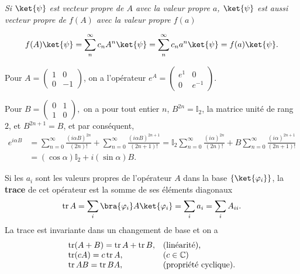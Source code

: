 \colorbox[gray]{0.8}{
\parbox[c]{0.9\textwidth}{
\emph{Si $\ket{\psi}$ est vecteur propre de $A$ avec la valeur propre $a$,
$\ket{\psi}$ est aussi vecteur propre de $f(A)$ avec la valeur propre $f(a)$}

\begin{equation}
f(A)\ket{\psi}=\sum_{n}^{\infty}c_{n}%
A^{n}\ket{\psi}=\sum_{n}^{\infty}c_{n}a^{n}\ket{\psi}=f(a)\ket{\psi}.
\end{equation}
}}

\begin{example}
Pour $A=\begin{pmatrix}1 & 0\\0 & -1\end{pmatrix} $, on a l'opérateur
$e^A=\begin{pmatrix}e^{1} & 0\\0 & e^{-1}\end{pmatrix}$.

Pour $B=\begin{pmatrix}0 & 1\\1 & 0\end{pmatrix},$ on a pour tout entier $n$,
$B^{2n}=\mathbb{I}_{2}$, la matrice unité de rang $2$, et $B^{2n+1}=B$, et par
conséquent,
\begin{equation}
\label{eq:ExpoB}
\begin{split}
e^{i\alpha B} &  =\sum_{n=0}^{\infty}\frac{(i\alpha B)^{2n}}{(2n)!}
+\sum_{n=0}^{\infty}\frac{(i\alpha B)^{2n+1}}{(2n+1)!}
=\mathbb{I}_{2}\sum_{n=0}^{\infty}\frac{(i\alpha)^{2n}}{(2n)!}+B\sum_{n=0}%
^{\infty}\frac{(i\alpha)^{2n+1}}{(2n+1)!}\\
&  =(\cos\alpha)\mathbb{I}_{2}+i(\sin\alpha)B.
\end{split}
\end{equation}

\end{example}

Si les $a_{i}$ sont les valeurs propres de l'opérateur $A$ dans la base
$\{\ket{\varphi_{i}}\}$, la \textbf{trace} de cet opérateur est la somme de ses
éléments diagonaux
\begin{equation}
\opn{tr}A=\sum_{i}\bra{\varphi_{i}} A\ket{\varphi_{i}} 
=\sum_{i}a_{i}=\sum_{i}A_{ii}.
\end{equation}
La trace est invariante dans un changement de base et on a
\begin{equation}%
\begin{array}{ll}
\opn{tr}(A+B) =\opn{tr}A+\opn{tr}B, &
\text{(linéarité),}\\
\opn{tr}(cA) =c\opn{tr}A, & (c\in\mathbb{C})\\
\opn{tr}AB =\opn{tr}BA, & \text{(propriété cyclique).}
\end{array}
\end{equation}

